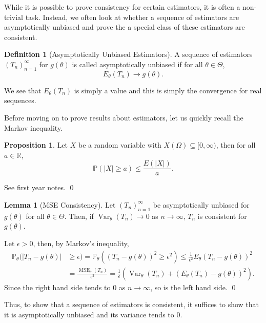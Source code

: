 \documentclass[
]{article}
\theoremstyle{definition}
\newtheorem{prop}{Proposition}
\theoremstyle{definition}
\newtheorem{definition}{Definition}[section]
\newtheorem{lemma}{Lemma}[section]
\begin{document}
While it is possible to prove consistency for certain estimators, it is
often a non-trivial task. Instead, we often look at whether a sequence
of estimators are asymptotically unbiased and prove the a special class
of these estimators are consistent.

\begin{definition}[Asymptotically Unbiased Estimators]
  A sequence of estimators \((T_n)_{n = 1}^\infty\) for \(g(\theta)\) is called 
  asymptotically unbiased if for all \(\theta \in \Theta\), 
  \[E_\theta(T_n) \to g(\theta).\]
\end{definition}

We see that \(E_\theta(T_n)\) is simply a value and this is simply the
convergence for real sequences.

Before moving on to prove results about estimators, let us quickly
recall the Markov inequality.

\begin{prop}
  Let \(X\) be a random variable with \(X(\Omega) \subseteq [0, \infty)\), then 
  for all \(a \in \mathbb{R}\),
  \[\mathbb{P}(|X| \ge a) \le \frac{E(|X|)}{a}.\]
\end{prop}
\proof

See first year notes. \qed

\begin{lemma}[MSE Consistency]
  Let \((T_n)_{n = 1}^\infty\) be asymptotically unbiased for \(g(\theta)\) for 
  all \(\theta \in \Theta\). Then, if \({\mathop{\mathrm{Var}}}_\theta(T_n) \to 0\) as \(n \to \infty\), 
  \(T_n\) is consistent for \(g(\theta)\).
\end{lemma}
\proof

Let \(\epsilon > 0\), then, by Markov's inequality, \[\begin{split}
    \mathbb{P}_\theta(|T_n - g(\theta)| & \ge \epsilon) 
    = \mathbb{P}_\theta((T_n - g(\theta))^2 \ge \epsilon^2)
    \le \frac{1}{\epsilon^2} E_\theta(T_n - g(\theta))^2 \\
    & = \frac{{\mathop{\mathrm{MSE}}}_{\theta}(T_n)}{\epsilon^2} = 
    \frac{1}{\epsilon}({\mathop{\mathrm{Var}}}_\theta(T_n) + (E_\theta(T_n) - g(\theta))^2). 
  \end{split}\] Since the right hand side tends to 0 as
\(n \to \infty\), so is the left hand side. \qed

Thus, to show that a sequence of estimators is consistent, it suffices
to show that it is asymptotically unbiased and its variance tends to 0.
\end{document}
